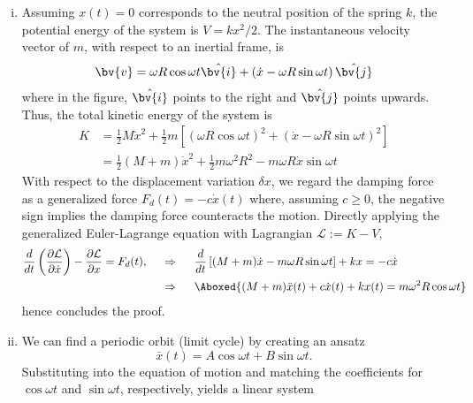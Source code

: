 \begin{enumerate}[(i)]
\item { %
    Assuming $x(t) = 0$ corresponds to the neutral position of the spring $k$, the potential energy of the system is $V = kx^2 / 2$.
    The instantaneous velocity vector of $m$, with respect to an inertial frame, is 
    \begin{equation}
        \bv{v} = \omega R \cos{\omega t} \hat{\bv{i}} + \left(\dot{x} - \omega R \sin{\omega t}\right) \hat{\bv{j}}
    \end{equation}
    where in the figure, $\hat{\bv{i}}$ points to the right and $\hat{\bv{j}}$ points upwards.
    Thus, the total kinetic energy of the system is 
    \begin{equation}
    \begin{aligned}
        K &= \frac{1}{2} M \dot{x}^2 + \frac{1}{2} m \left[ {\left(\omega R \cos{\omega t} \right)}^2 + {\left( \dot{x} - \omega R \sin{\omega t} \right)}^2 \right] \\
        &= \frac{1}{2} (M + m) \dot{x}^2 + \frac{1}{2}m\omega^2 R^2 - m \omega R \dot{x} \sin{\omega t}
    \end{aligned}
    \end{equation}
    With respect to the displacement variation $\delta x$, we regard the damping force as a generalized force $F_d(t) = -c \dot{x}(t)$ where, assuming $c \geq 0$, the negative sign implies the damping force counteracts the motion.
    Directly applying the generalized Euler-Lagrange equation with Lagrangian $\mathcal{L} := K - V$, 
    \begin{equation}
    \begin{aligned}
        \frac{d}{dt} \left( \frac{\partial \mathcal{L}}{\partial \dot{x}} \right) - \frac{\partial \mathcal{L}}{\partial x} = F_d(t), ~~~~ &\Rightarrow ~~~~ \frac{d}{dt}\left[(M+m)\dot{x} - m \omega R \sin\omega t\right] + kx = -c\dot{x} \\
        &\Rightarrow ~~~~ \Aboxed{(M + m) \ddot{x}(t) + c \dot{x}(t) + k x(t) = m \omega^2 R \cos \omega t}
    \end{aligned}
    \end{equation}
    hence concludes the proof. 
}
\item { %
    We can find a periodic orbit (limit cycle) by creating an ansatz 
    \begin{equation}
        \boxed{\bar{x}(t) = A \cos \omega t + B \sin\omega t}.
    \end{equation}
    Substituting into the equation of motion and matching the coefficients for $\cos\omega t$ and $\sin\omega t$, respectively, yields a linear system 
}
\end{enumerate}
